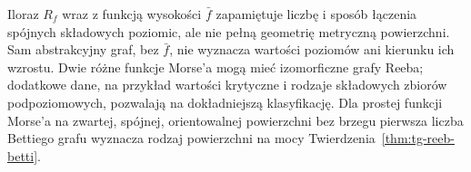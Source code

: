 \begin{uwaga}
Iloraz $R_f$ wraz z funkcją wysokości $\bar f$
zapamiętuje liczbę i sposób łączenia spójnych
składowych poziomic, ale nie pełną geometrię
metryczną powierzchni. Sam abstrakcyjny graf,
bez $\bar f$, nie wyznacza wartości poziomów
ani kierunku ich wzrostu. Dwie różne funkcje Morse'a
mogą mieć izomorficzne grafy Reeba; dodatkowe dane,
na przykład wartości krytyczne i rodzaje składowych
zbiorów podpoziomowych, pozwalają na dokładniejszą klasyfikację.
Dla prostej funkcji Morse'a na zwartej, spójnej,
orientowalnej powierzchni bez brzegu pierwsza liczba
Bettiego grafu wyznacza rodzaj powierzchni na mocy
Twierdzenia~\ref{thm:tg-reeb-betti}.
\end{uwaga}

